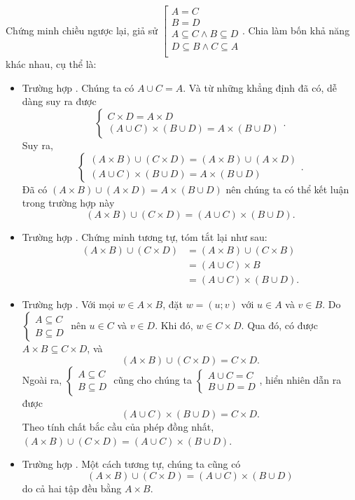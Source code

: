 Chứng minh chiều ngược lại, giả sử $\left[\begin{array}{l}
   A = C \\
   B = D \\
   A \subseteq C \land B \subseteq D \\
   D \subseteq B \land C \subseteq A \\
\end{array}\right.$. Chia làm bốn khả năng khác nhau, cụ thể là:
\begin{itemize}
   \item Trường hợp . Chúng ta có $A \cup C = A$. Và từ những khẳng định đã có, dễ dàng suy ra được $$\begin{cases}
      C \times D = A \times D \\
      (A \cup C) \times (B \cup D) = A \times (B \cup D)
   \end{cases}.$$ Suy ra, $$\begin{cases}
      (A \times B) \cup (C \times D) = (A \times B) \cup (A \times D) \\
      (A \cup C) \times (B \cup D) = A \times (B \cup D)
   \end{cases}.$$
   Đã có $(A \times B) \cup (A \times D) = A \times (B \cup D)$ nên chúng ta có thể kết luận trong trường hợp này
   $$(A \times B) \cup (C \times D) = (A \cup C) \times (B \cup D).$$
   \item Trường hợp . Chứng minh tương tự, tóm tắt lại như sau:
   \begin{align*}
      (A \times B) \cup (C \times D) &= (A \times B) \cup (C \times B) \\
         &= (A \cup C) \times B \\
         &= (A \cup C) \times (B \cup D).
   \end{align*}
   \item Trường hợp . Với mọi $w \in A \times B$, đặt $w = (u; v)$ với $u \in A$ và $v \in B$. Do $\begin{cases}
      A \subseteq C \\
      B \subseteq D
   \end{cases}$ nên $u \in C$ và $v \in D$. Khi đó, $w \in C \times D$. Qua đó, có được $A \times B \subseteq C \times D$, và $$(A \times B) \cup (C \times D) = C \times D.$$
   Ngoài ra, $\begin{cases}
      A \subseteq C \\
      B \subseteq D
   \end{cases}$ cũng cho chúng ta $\begin{cases}
      A \cup C = C \\
      B \cup D = D
   \end{cases}$, hiển nhiên dẫn ra được $$(A \cup C) \times (B \cup D) = C \times D.$$
   Theo tính chất bắc cầu của phép đồng nhất, $(A \times B) \cup (C \times D) = (A \cup C) \times (B \cup D)$.
   \item Trường hợp . Một cách tương tự, chúng ta cũng có $$(A \times B) \cup (C \times D) = (A \cup C) \times (B \cup D)$$ do cả hai tập đều bằng $A \times B$.
\end{itemize}

